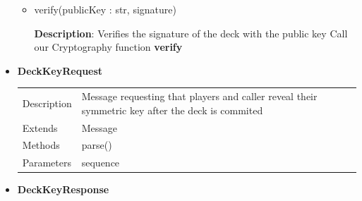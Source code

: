 \documentclass[11pt]{article}
\begin{document}
\begin{itemize}
\begin{itemize}
  \item verify(publicKey : str, signature)

  \textbf{Description}: Verifies the signature of the deck with the
  public key Call our Cryptography function \textbf{verify}  
  
  \end{itemize}
 
\item
  \textbf{DeckKeyRequest}

  \begin{longtable}[]{@{}ll@{}}
  \toprule
  \endhead
  \begin{minipage}[t]{0.40\columnwidth}\raggedright
  Description\strut
  \end{minipage} & \begin{minipage}[t]{0.54\columnwidth}\raggedright
  Message requesting that players and caller reveal their symmetric key
  after the deck is commited\strut
  \end{minipage}\tabularnewline
  \begin{minipage}[t]{0.40\columnwidth}\raggedright
  Extends\strut
  \end{minipage} & \begin{minipage}[t]{0.54\columnwidth}\raggedright
  Message\strut
  \end{minipage}\tabularnewline
  \begin{minipage}[t]{0.40\columnwidth}\raggedright
  Methods\strut
  \end{minipage} & \begin{minipage}[t]{0.54\columnwidth}\raggedright
  parse()\strut
  \end{minipage}\tabularnewline
  \begin{minipage}[t]{0.40\columnwidth}\raggedright
  Parameters\strut
  \end{minipage} & \begin{minipage}[t]{0.54\columnwidth}\raggedright
  sequence\strut
  \end{minipage}\tabularnewline
  \bottomrule
  \end{longtable}


\item
  \textbf{DeckKeyResponse}


\end{itemize}
\end{document}

